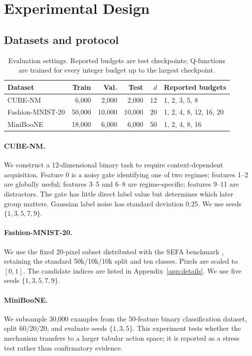 \documentclass[10pt]{article}
\begin{document}
\section{Experimental Design}
\subsection{Datasets and protocol}
\begin{table}[t]
\centering
\caption{Evaluation settings. Reported budgets are test checkpoints; Q-functions are trained for every integer budget up to the largest checkpoint.}
\label{tab:data}
\small
\begin{tabular}{lrrrrl}
\toprule
Dataset & Train & Val. & Test & $d$ & Reported budgets \\
\midrule
CUBE-NM & 6,000 & 2,000 & 2,000 & 12 & 1, 2, 3, 5, 8 \\
Fashion-MNIST-20 & 50,000 & 10,000 & 10,000 & 20 & 1, 2, 4, 8, 12, 16, 20 \\
MiniBooNE & 18,000 & 6,000 & 6,000 & 50 & 1, 2, 4, 8, 16 \\
\bottomrule
\end{tabular}
\end{table}

\paragraph{CUBE-NM.}
We construct a 12-dimensional binary task to require context-dependent acquisition. Feature 0 is a noisy gate identifying one of two regimes; features 1--2 are globally useful; features 3--5 and 6--8 are regime-specific; features 9--11 are distractors. The gate has little direct label value but determines which later group matters. Gaussian label noise has standard deviation 0.25. We use seeds $\{1,3,5,7,9\}$.

\paragraph{Fashion-MNIST-20.}
We use the fixed 20-pixel subset distributed with the SEFA benchmark \citep{norcliffe2025sefa}, retaining the standard 50k/10k/10k split and ten classes. Pixels are scaled to $[0,1]$. The candidate indices are listed in Appendix~\ref{app:details}. We use five seeds $\{1,3,5,7,9\}$.

\paragraph{MiniBooNE.}
We subsample 30,000 examples from the 50-feature binary classification dataset, split 60/20/20, and evaluate seeds $\{1,3,5\}$. This experiment tests whether the mechanism transfers to a larger tabular action space; it is reported as a stress test rather than confirmatory evidence.
\end{document}
